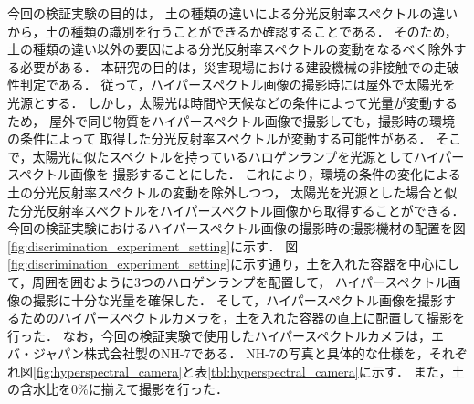 今回の検証実験の目的は，
土の種類の違いによる分光反射率スペクトルの違いから，土の種類の識別を行うことができるか確認することである．
そのため，土の種類の違い以外の要因による分光反射率スペクトルの変動をなるべく除外する必要がある．
本研究の目的は，災害現場における建設機械の非接触での走破性判定である．
従って，ハイパースペクトル画像の撮影時には屋外で太陽光を光源とする．
しかし，太陽光は時間や天候などの条件によって光量が変動するため，
屋外で同じ物質をハイパースペクトル画像で撮影しても，撮影時の環境の条件によって
取得した分光反射率スペクトルが変動する可能性がある．
そこで，太陽光に似たスペクトルを持っているハロゲンランプを光源としてハイパースペクトル画像を
撮影することにした．
これにより，環境の条件の変化による土の分光反射率スペクトルの変動を除外しつつ，
太陽光を光源とした場合と似た分光反射率スペクトルをハイパースペクトル画像から取得することができる．
今回の検証実験におけるハイパースペクトル画像の撮影時の撮影機材の配置を図\ref{fig:discrimination_experiment_setting}に示す．%
図\ref{fig:discrimination_experiment_setting}に示す通り，土を入れた容器を中心にして，周囲を囲むように3つのハロゲンランプを配置して，
ハイパースペクトル画像の撮影に十分な光量を確保した．
そして，ハイパースペクトル画像を撮影するためのハイパースペクトルカメラを，土を入れた容器の直上に配置して撮影を行った．
なお，今回の検証実験で使用したハイパースペクトルカメラは，エバ・ジャパン株式会社製のNH-7である．
NH-7の写真と具体的な仕様を，それぞれ図\ref{fig:hyperspectral_camera}と表\ref{tbl:hyperspectral_camera}に示す．
また，土の含水比を0$\%$に揃えて撮影を行った．

